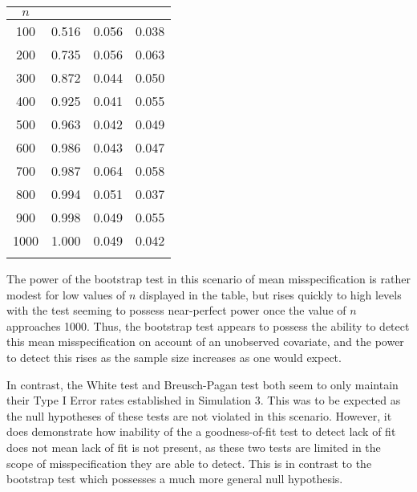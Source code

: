 		\begin{table}[H]
			\centering
			\small\addtolength{\tabcolsep}{-3pt}
			\setlength\extrarowheight{-3pt}
			{
			\begin{tabular}{ c|c|c|c}
			$n$ & \vtop{\hbox{\strut Bootstrap}\hbox{\strut Test}} & \vtop{\hbox{\strut White}\hbox{\strut Test}} & \vtop{\hbox{\strut Breusch-Pagan} \hbox{\strut Test}} \\
			 \hline
			 100 & 0.516 & 0.056 & 0.038 \\
			 200 & 0.735 & 0.056 & 0.063 \\
			 300 & 0.872 & 0.044 & 0.050 \\
			 400 & 0.925 & 0.041 & 0.055 \\
			 500 & 0.963 & 0.042 & 0.049 \\
			 600 & 0.986 & 0.043 & 0.047 \\
			 700 & 0.987 & 0.064 & 0.058 \\
			 800 & 0.994 & 0.051 & 0.037 \\
			 900 & 0.998 & 0.049 & 0.055 \\
			 1000 & 1.000 & 0.049 & 0.042 \\
			 
			 \Xhline{3\arrayrulewidth}
			\end{tabular}
			}
		\end{table}

		The power of the bootstrap test in this scenario of mean misspecification is rather modest for low values of $n$ displayed in the table, but rises quickly to high levels
		with the test seeming to possess near-perfect power once the value of $n$ approaches 1000. Thus, the bootstrap test appears to possess the ability to detect this mean
		misspecification on account of an unobserved covariate, and the power to detect this rises as the sample size increases as one would expect.

		In contrast, the White test and Breusch-Pagan test both seem to only maintain their Type I Error rates established in Simulation 3. This was to be expected
		as the null hypotheses of these tests are not violated in this scenario. However, it does demonstrate how inability of the a goodness-of-fit test to detect lack of
		fit does not mean lack of fit is not present, as these two tests are limited in the scope of misspecification they are able to detect. This is in contrast to the
		bootstrap test which possesses a much more general null hypothesis.

